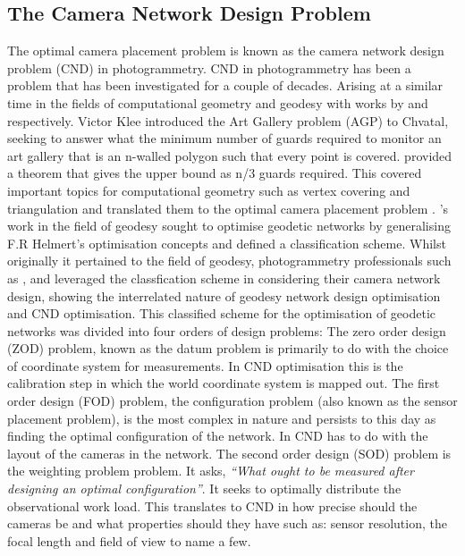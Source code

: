 \subsection{The Camera Network Design Problem}
The optimal camera placement problem is known as the camera network design problem (CND) in photogrammetry. CND in photogrammetry has been a problem that has been investigated for a couple of decades. Arising at a similar time in the fields of computational geometry and geodesy with works by \citet{chvatal1975combinatorial} and \citet{grafarend1974optimization} respectively. Victor Klee introduced the Art Gallery problem (AGP) to Chvatal, seeking to answer what the minimum number of guards required to monitor an art  gallery that is an n-walled polygon such that every point is covered. \citet{chvatal1975combinatorial} provided a theorem that gives the upper bound as n/3 guards required. This covered important topics for computational geometry such as vertex covering and triangulation and translated them to the optimal camera placement problem \cite{o1987art}.
\cite{grafarend1974optimization}'s work in the field of geodesy sought to optimise geodetic networks by generalising F.R Helmert's optimisation concepts and defined a classification scheme.  Whilst originally it pertained to the field of geodesy, photogrammetry professionals such as \citet{fraser1984network}, \citet{shortis1989network} and \cite{mason1994expert} leveraged the classfication scheme in considering their camera network design, showing the interrelated nature of geodesy network design optimisation and CND optimisation. This classified scheme for the optimisation of geodetic networks was divided into four orders of design problems: 
The zero order design (ZOD) problem, known as the datum problem is primarily to do with the choice of coordinate system for measurements. In CND optimisation this is the calibration step in which the world coordinate system is mapped out. 
The first order design (FOD) problem, the configuration problem (also known as the sensor placement problem), is the most complex in nature and persists to this day as finding the optimal configuration of the network. In CND has to do with the layout of the cameras in the network. 
The second order design (SOD) problem is the weighting problem problem. It asks, \textit{``What ought to be 
measured after designing an optimal configuration''}. It seeks to optimally distribute the observational work load. This translates to CND in how precise should the cameras be and what properties should they have such as: sensor resolution, the focal length and field of view to name a few. 
